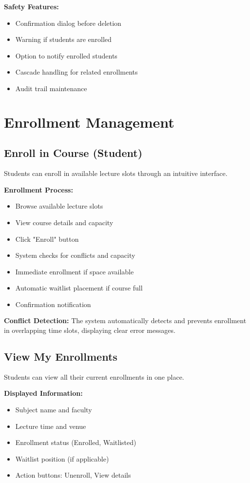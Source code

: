 \textbf{Safety Features:}
\begin{itemize}
    \item Confirmation dialog before deletion
    \item Warning if students are enrolled
    \item Option to notify enrolled students
    \item Cascade handling for related enrollments
    \item Audit trail maintenance
\end{itemize}

\section{Enrollment Management}

\subsection{Enroll in Course (Student)}
Students can enroll in available lecture slots through an intuitive interface.

\textbf{Enrollment Process:}
\begin{itemize}
    \item Browse available lecture slots
    \item View course details and capacity
    \item Click "Enroll" button
    \item System checks for conflicts and capacity
    \item Immediate enrollment if space available
    \item Automatic waitlist placement if course full
    \item Confirmation notification
\end{itemize}

\textbf{Conflict Detection:} The system automatically detects and prevents enrollment in overlapping time slots, displaying clear error messages.

\subsection{View My Enrollments}
Students can view all their current enrollments in one place.

\textbf{Displayed Information:}
\begin{itemize}
    \item Subject name and faculty
    \item Lecture time and venue
    \item Enrollment status (Enrolled, Waitlisted)
    \item Waitlist position (if applicable)
    \item Action buttons: Unenroll, View details
\end{itemize}

